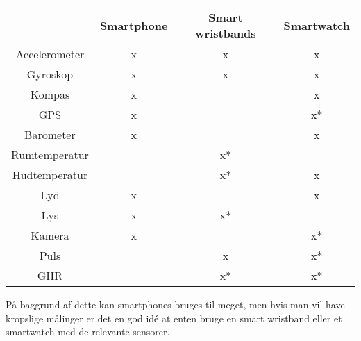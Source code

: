 \begin{table}
\centering
\begin{tabular}{|c|c|c|c|}
\hline  			 & Smartphone 	& Smart wristbands 	& Smartwatch 	\\ 
\hline Accelerometer &  x		  	&  			x	 	&  		x  		\\ 
\hline Gyroskop		 &	x			&			x		&		x		\\
\hline Kompas		 &  x			&					&		x		\\
\hline GPS			 &	x			&					&		x*		\\
\hline Barometer	 &	x			&					&		x		\\
\hline Rumtemperatur &				&			x*		&				\\
\hline Hudtemperatur &				&			x*		&		x		\\
\hline Lyd			 &	x			&					&		x		\\
\hline Lys			 &	x			&			x*		&				\\
\hline Kamera		 &	x			&					&		x*		\\
\hline Puls			 &				&			x		&		x*		\\
\hline GHR			 &				&			x*		&		x*		\\ \hline
\end{tabular} 
\end{table}

På baggrund af dette kan smartphones bruges til meget, men hvis man vil have kropslige målinger er det en god idé at enten bruge en smart wristband eller et smartwatch med de relevante sensorer.